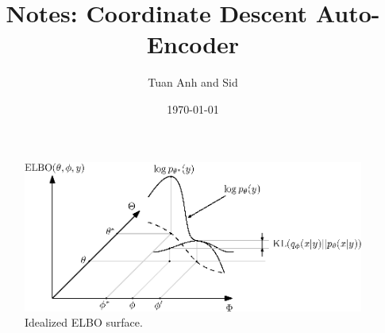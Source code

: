 \documentclass[a4paper]{article}
\title{Notes: Coordinate Descent Auto-Encoder}
\author{Tuan Anh and Sid}
\date{\today}
\begin{document}
\maketitle





\begin{figure}
    \centering
    \includegraphics{figures/elbo}
    \caption{Idealized \gls{ELBO} surface.}
\end{figure}


\end{document}
